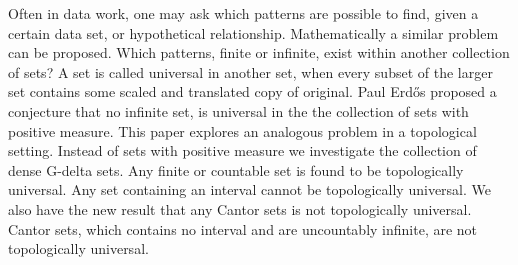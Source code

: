 \documentclass{amsart}
\begin{document}
Often in data work, one may ask which patterns are possible to find, given a certain data set, or hypothetical relationship.  Mathematically a similar problem can be proposed.  Which patterns, finite or infinite, exist within another collection of sets?  A set is called universal in another set, when every subset of the larger set contains some scaled and translated copy of original.  Paul Erd\H{o}s proposed a conjecture that no infinite set, is universal in the the collection of sets with positive measure.  This paper explores an analogous problem in a topological setting. Instead of sets with positive measure we investigate the collection of dense G-delta sets.  Any finite or countable set is found to be topologically universal.  Any set containing an interval cannot be topologically universal.  We also have the new result that any Cantor sets is not topologically universal.  Cantor sets, which contains no interval and are uncountably infinite, are not topologically universal.  


\end{document}
